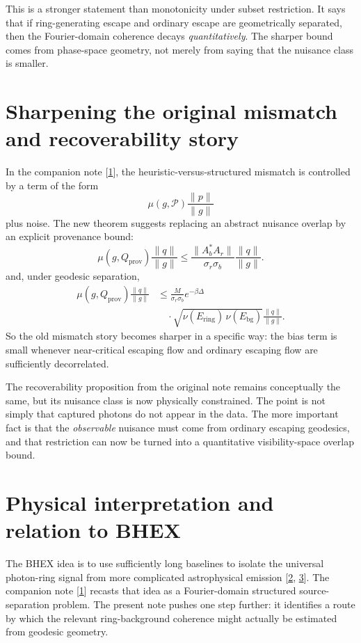 \documentclass[10pt,letterpaper,twocolumn]{article}
\begin{document}
This is a stronger statement than monotonicity under subset restriction. It says that if ring-generating
escape and ordinary escape are geometrically separated, then the Fourier-domain coherence decays
\emph{quantitatively}. The sharper bound comes from phase-space geometry, not merely from saying that the
nuisance class is smaller.

\section{Sharpening the original mismatch and recoverability story}

In the companion note [\hyperlink{ref-1}{1}], the heuristic-versus-structured mismatch is controlled by a term of the form
\[
\mu(g,\mathcal P)\frac{\|p\|}{\|g\|}
\]
plus noise. The new theorem suggests replacing an abstract nuisance overlap by an explicit provenance bound:
\begin{equation}
\mu(g,Q_{\mathrm{prov}})\frac{\|q\|}{\|g\|}
\le
\frac{\|A_b^*A_r\|}{\sigma_r\sigma_b}\frac{\|q\|}{\|g\|}.
\end{equation}
and, under geodesic separation,
\begin{equation}
\begin{aligned}
\mu(g,Q_{\mathrm{prov}})\frac{\|q\|}{\|g\|}
&\le
\frac{M}{\sigma_r\sigma_b}e^{-\beta\Delta} \\
&\quad \cdot \sqrt{\nu(E_{\mathrm{ring}})\,\nu(E_{\mathrm{bg}})}\frac{\|q\|}{\|g\|}.
\end{aligned}
\end{equation}
So the old mismatch story becomes sharper in a specific way: the bias term is small whenever
near-critical escaping flow and ordinary escaping flow are sufficiently decorrelated.

The recoverability proposition from the original note remains conceptually the same, but its nuisance class is
now physically constrained. The point is not simply that captured photons do not appear in the data. The more
important fact is that the \emph{observable} nuisance must come from ordinary escaping geodesics, and that
restriction can now be turned into a quantitative visibility-space overlap bound.

\section{Physical interpretation and relation to BHEX}

The BHEX idea is to use sufficiently long baselines to isolate the universal photon-ring signal from more
complicated astrophysical emission [\hyperlink{ref-2}{2}, \hyperlink{ref-3}{3}]. The companion note [\hyperlink{ref-1}{1}] recasts that idea as a Fourier-domain structured source-separation problem. The present note pushes one step further: it identifies a route by which the
relevant ring-background coherence might actually be estimated from geodesic geometry.
\end{document}
